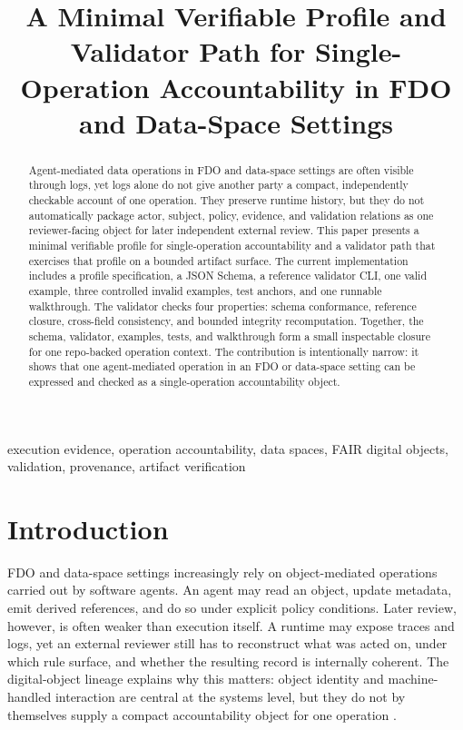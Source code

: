 \documentclass[conference]{IEEEtran}
\title{A Minimal Verifiable Profile and Validator Path for Single-Operation Accountability in FDO and Data-Space Settings}
\author{\IEEEauthorblockN{Anonymous Submission}}
\begin{document}
\maketitle

\begin{abstract}
Agent-mediated data operations in FDO and data-space settings are often visible through logs, yet logs alone do not give another party a compact, independently checkable account of one operation. They preserve runtime history, but they do not automatically package actor, subject, policy, evidence, and validation relations as one reviewer-facing object for later independent external review. This paper presents a minimal verifiable profile for single-operation accountability and a validator path that exercises that profile on a bounded artifact surface. The current implementation includes a profile specification, a JSON Schema, a reference validator CLI, one valid example, three controlled invalid examples, test anchors, and one runnable walkthrough. The validator checks four properties: schema conformance, reference closure, cross-field consistency, and bounded integrity recomputation. Together, the schema, validator, examples, tests, and walkthrough form a small inspectable closure for one repo-backed operation context. The contribution is intentionally narrow: it shows that one agent-mediated operation in an FDO or data-space setting can be expressed and checked as a single-operation accountability object.
\end{abstract}

\begin{IEEEkeywords}
execution evidence, operation accountability, data spaces, FAIR digital objects, validation, provenance, artifact verification
\end{IEEEkeywords}

\section{Introduction}

FDO and data-space settings increasingly rely on object-mediated operations carried out by software agents. An agent may read an object, update metadata, emit derived references, and do so under explicit policy conditions. Later review, however, is often weaker than execution itself. A runtime may expose traces and logs, yet an external reviewer still has to reconstruct what was acted on, under which rule surface, and whether the resulting record is internally coherent. The digital-object lineage explains why this matters: object identity and machine-handled interaction are central at the systems level, but they do not by themselves supply a compact accountability object for one operation \cite{kahn2006framework,dona2018doip,soilandreyes2024evaluating}.
\end{document}
